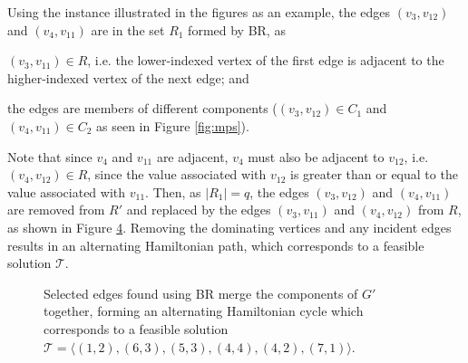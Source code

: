 \documentclass[oribibl]{llncs}
\begin{document}
Using the instance illustrated in the figures as an example, the edges $(v_3, v_{12})$ and $(v_4, v_{11})$ are in the set $R_1$ formed by BR, as \begin{enumerate*}[label={(\alph*)}]
	\item $(v_3, v_{11}) \in R$, i.e. the lower-indexed vertex of the first edge is adjacent to the higher-indexed vertex of the next edge; and
	\item the edges are members of different components ($(v_3, v_{12}) \in C_1$ and $(v_4, v_{11}) \in C_2$ as seen in Figure \ref{fig:mps}).
\end{enumerate*}
Note that since $v_4$ and $v_{11}$ are adjacent, $v_4$ must also be adjacent to $v_{12}$, i.e. $(v_4, v_{12}) \in R$, since the value associated with $v_{12}$ is greater than or equal to the value associated with $v_{11}$. Then, as $|R_1| = q$, the edges $(v_3, v_{12})$ and $(v_4, v_{11})$ are removed from $R'$ and replaced by the edges $(v_3, v_{11})$ and $(v_4, v_{12})$ from $R$, as shown in Figure \ref{fig:connect/cycle}. Removing the dominating vertices and any incident edges results in an alternating Hamiltonian path, which corresponds to a feasible solution $\mathcal{T}$. 

\begin{figure}	
	\centering
	\begin{subfigure}[H]{0.57\textwidth}
		
		\label{fig:mpsconnect}
	\end{subfigure}
	\begin{subfigure}[H]{0.57\textwidth}
		
		\label{fig:mpscycle}
	\end{subfigure}
	\begin{subfigure}[H]{0.6\textwidth}
		
		\label{fig:mpspath}
	\end{subfigure}
	\caption{Selected edges found using BR merge the components of $G'$ together, forming an alternating Hamiltonian cycle which corresponds to a feasible solution $\mathcal{T} = \langle(1,2), (6,3), (5,3), (4,4), (4,2), (7,1) \rangle$.}
	\label{fig:connect/cycle}
\end{figure}
\end{document}
